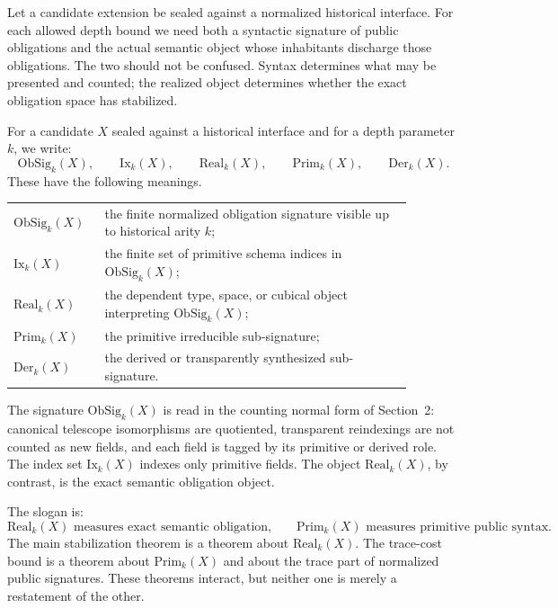 Let a candidate extension be sealed against a normalized historical interface.  For each
allowed depth bound we need both a syntactic signature of public obligations and the actual
semantic object whose inhabitants discharge those obligations.  The two should not be
confused.  Syntax determines what may be presented and counted; the realized object
determines whether the exact obligation space has stabilized.

\begin{definition}
\label{def:obsig-real}
For a candidate \(X\) sealed against a historical interface and for a depth parameter
\(k\), we write:
\[
  \mathrm{ObSig}_k(X),\qquad
  \mathrm{Ix}_k(X),\qquad
  \mathrm{Real}_k(X),\qquad
  \mathrm{Prim}_k(X),\qquad
  \mathrm{Der}_k(X).
\]
These have the following meanings.
\begin{center}
\begin{tabular}{p{0.18\linewidth}p{0.70\linewidth}}
\hline
\(\mathrm{ObSig}_k(X)\) & the finite normalized obligation signature visible up to
historical arity \(k\); \\
\(\mathrm{Ix}_k(X)\) & the finite set of primitive schema indices in
\(\mathrm{ObSig}_k(X)\); \\
\(\mathrm{Real}_k(X)\) & the dependent type, space, or cubical object interpreting
\(\mathrm{ObSig}_k(X)\); \\
\(\mathrm{Prim}_k(X)\) & the primitive irreducible sub-signature; \\
\(\mathrm{Der}_k(X)\) & the derived or transparently synthesized sub-signature. \\
\hline
\end{tabular}
\end{center}
The signature \(\mathrm{ObSig}_k(X)\) is read in the counting normal form of
Section~2: canonical telescope isomorphisms are quotiented, transparent reindexings are not
counted as new fields, and each field is tagged by its primitive or derived role.  The index
set \(\mathrm{Ix}_k(X)\) indexes only primitive fields.  The object
\(\mathrm{Real}_k(X)\), by contrast, is the exact semantic obligation object.
\end{definition}

The slogan is:
\[
  \mathrm{Real}_k(X) \text{ measures exact semantic obligation,}
  \qquad
  \mathrm{Prim}_k(X) \text{ measures primitive public syntax.}
\]
The main stabilization theorem is a theorem about \(\mathrm{Real}_k(X)\).  The trace-cost
bound is a theorem about \(\mathrm{Prim}_k(X)\) and about the trace part of normalized public
signatures.  These theorems interact, but neither one is merely a restatement of the other.


